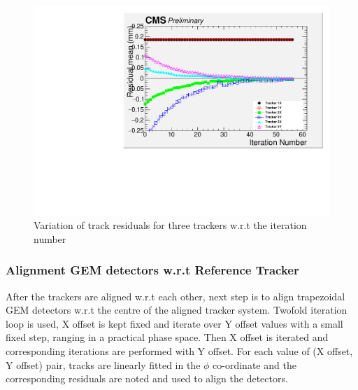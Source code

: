 \begin{figure}[!htbp]
\centering
\includegraphics[width=5.1in]{figures/GEM/Residual_Tracker_Run1897.pdf}
\caption{Variation of track residuals for three trackers  w.r.t the iteration number}\label{fig:resvsit}
\end{figure}

\subsubsection{Alignment GEM detectors w.r.t Reference Tracker}
After the trackers are aligned w.r.t each other, next step is to align trapezoidal GEM detectors w.r.t the centre of the aligned tracker system.
Twofold iteration loop is used, X offset is kept fixed and iterate over Y offset values with a small fixed step, ranging in a practical phase space. Then X offset is iterated and corresponding iterations are performed with Y offset. For each value of (X offset, Y offset) pair, tracks are linearly fitted in the $\phi$ co-ordinate and the corresponding residuals are noted and used to align the detectors.


